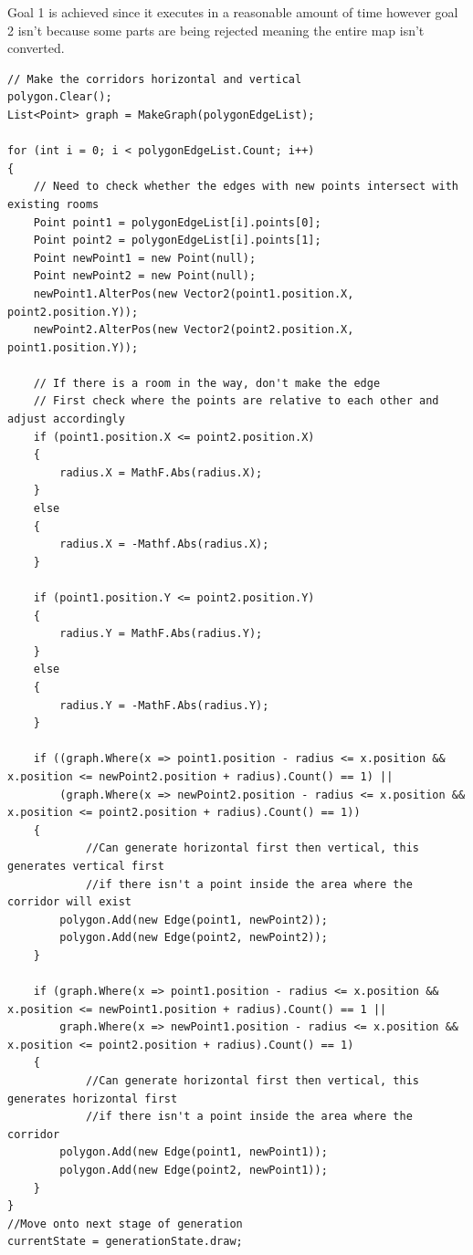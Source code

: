 \documentclass{article}
\begin{document}
Goal 1 is achieved since it executes in a reasonable amount of time however goal 2 isn't because some parts are being rejected meaning the entire map isn't converted.
\begin{lstlisting}
// Make the corridors horizontal and vertical
polygon.Clear();
List<Point> graph = MakeGraph(polygonEdgeList);

for (int i = 0; i < polygonEdgeList.Count; i++)
{
    // Need to check whether the edges with new points intersect with existing rooms
    Point point1 = polygonEdgeList[i].points[0];
    Point point2 = polygonEdgeList[i].points[1];
    Point newPoint1 = new Point(null);
    Point newPoint2 = new Point(null);
    newPoint1.AlterPos(new Vector2(point1.position.X, point2.position.Y));
    newPoint2.AlterPos(new Vector2(point2.position.X, point1.position.Y));

    // If there is a room in the way, don't make the edge
    // First check where the points are relative to each other and adjust accordingly
    if (point1.position.X <= point2.position.X)
    {
        radius.X = MathF.Abs(radius.X);
    }
    else
    {
        radius.X = -Mathf.Abs(radius.X);
    }
    
    if (point1.position.Y <= point2.position.Y)
    {
        radius.Y = MathF.Abs(radius.Y);
    }
    else
    {
        radius.Y = -MathF.Abs(radius.Y);
    }

    if ((graph.Where(x => point1.position - radius <= x.position && x.position <= newPoint2.position + radius).Count() == 1) ||
        (graph.Where(x => newPoint2.position - radius <= x.position && x.position <= point2.position + radius).Count() == 1))
    {
    		//Can generate horizontal first then vertical, this generates vertical first
    		//if there isn't a point inside the area where the corridor will exist
        polygon.Add(new Edge(point1, newPoint2));
        polygon.Add(new Edge(point2, newPoint2));
    }

    if (graph.Where(x => point1.position - radius <= x.position && x.position <= newPoint1.position + radius).Count() == 1 ||
        graph.Where(x => newPoint1.position - radius <= x.position && x.position <= point2.position + radius).Count() == 1)
    {
    		//Can generate horizontal first then vertical, this generates horizontal first
    		//if there isn't a point inside the area where the corridor
        polygon.Add(new Edge(point1, newPoint1));
        polygon.Add(new Edge(point2, newPoint1));
    }
}
//Move onto next stage of generation
currentState = generationState.draw;
\end{lstlisting}
\end{document}

